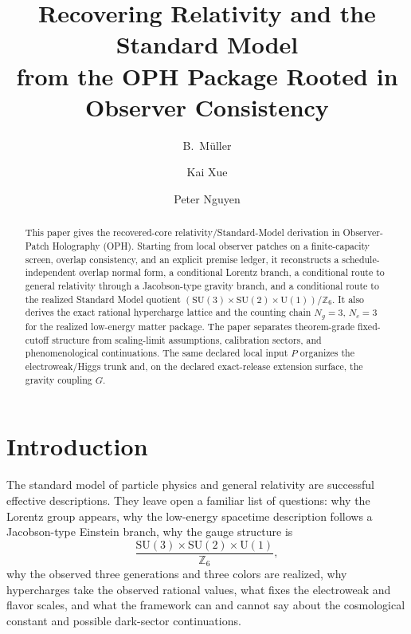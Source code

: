\documentclass[11pt]{article}
\title{Recovering Relativity and the Standard Model\\
from the OPH Package Rooted in Observer Consistency}
\author{B.\ M\"uller \and Kai Xue \and Peter Nguyen}
\date{\OPHPaperReleaseDate}
\newcommand{\SU}{\mathrm{SU}}
\newcommand{\U}{\mathrm{U}}
\begin{document}
\maketitle
\OPHPaperReleaseBanner

\begin{abstract}
This paper gives the recovered-core relativity/Standard-Model derivation in Observer-Patch Holography (OPH). Starting from local observer patches on a finite-capacity screen, overlap consistency, and an explicit premise ledger, it reconstructs a schedule-independent overlap normal form, a conditional Lorentz branch, a conditional route to general relativity through a Jacobson-type gravity branch, and a conditional route to the realized Standard Model quotient \(\left(\SU(3)\times\SU(2)\times\U(1)\right)/\mathbb Z_6\). It also derives the exact rational hypercharge lattice and the counting chain \(N_g=3\), \(N_c=3\) for the realized low-energy matter package. The paper separates theorem-grade fixed-cutoff structure from scaling-limit assumptions, calibration sectors, and phenomenological continuations. The same declared local input \(P\) organizes the electroweak/Higgs trunk and, on the declared exact-release extension surface, the gravity coupling \(G\).
\end{abstract}

\section{Introduction}

The standard model of particle physics and general relativity are successful effective descriptions. They leave open a familiar list of questions: why the Lorentz group appears, why the low-energy spacetime description follows a Jacobson-type Einstein branch, why the gauge structure is
\[
\frac{\SU(3)\times\SU(2)\times\U(1)}{\mathbb Z_6},
\]
why the observed three generations and three colors are realized, why hypercharges take the observed rational values, what fixes the electroweak and flavor scales, and what the framework can and cannot say about the cosmological constant and possible dark-sector continuations.
\end{document}
